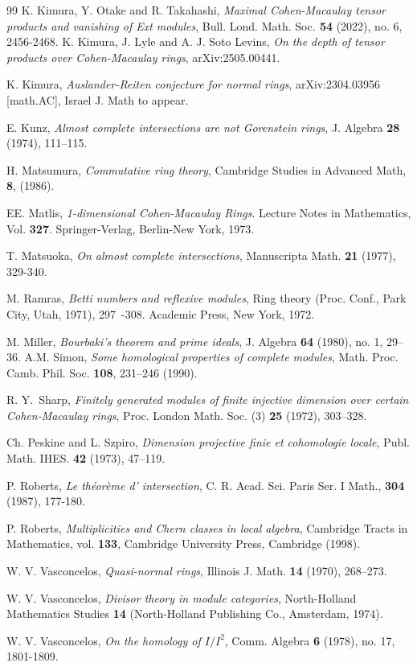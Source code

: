 \documentclass[10. pt,a4paper]{amsart}
\theoremstyle{definition}
\theoremstyle{remark}
\begin{document}
\begin{thebibliography}{99}
  K. Kimura, Y. Otake and R. Takahashi, \emph{Maximal Cohen-Macaulay tensor products and vanishing of Ext modules},
Bull. Lond. Math. Soc.{\bf{ 54}} (2022), no. 6, 2456-2468.
 K. Kimura, J. Lyle and A. J. Soto Levins, {\it
On the depth of tensor products over Cohen-Macaulay rings},  arXiv:2505.00441.

K. Kimura, \emph{
Auslander-Reiten conjecture for normal rings}, arXiv:2304.03956 [math.AC], Israel J. Math
to appear. 

E. Kunz, \emph{Almost complete intersections are not Gorenstein rings}, J. Algebra {\bf{28}} (1974), 111–115.

H. Matsumura, \emph{Commutative ring theory}, Cambridge Studies in Advanced Math, \textbf{8}, (1986).

\bibitem
{E}{E. Matlis}, {\it 1-dimensional Cohen-Macaulay Rings}. Lecture Notes in Mathematics, Vol.  {\bf327}. Springer-Verlag, Berlin-New York, 1973.

T. Matsuoka, \emph{On almost complete intersections}, Manuscripta Math. {\bf{21}} (1977),
329-340.


M. Ramras, \emph{Betti numbers and reflexive modules}, Ring theory (Proc. Conf., Park City, Utah, 1971),   297~-308. Academic Press, New York, 1972.

M.
Miller, \emph{Bourbaki's theorem and prime ideals},
J. Algebra {\bf64} (1980), no. 1, 29–36.
A.M.
Simon, \emph{Some homological properties of complete modules}, Math. Proc. Camb. Phil. Soc.
{\bf108}, 231–246 (1990).


 R. Y.~Sharp, 
\emph{Finitely generated modules of finite injective dimension over certain Cohen-Macaulay rings},
Proc. London Math. Soc. (3) {\bf{25}} (1972), 303–328.





Ch. Peskine and L. Szpiro, \emph{Dimension projective finie et cohomologie locale},
Publ. Math. IHES.  {\bf42} (1973),  47--119.


P. Roberts, \emph{Le th\'{e}or\`{e}me d' intersection}, C. R. Acad. Sci. Paris Ser. I Math.,
{\bf{304}}  (1987),  177-180.

P. Roberts, \emph{Multiplicities and Chern classes in local algebra}, Cambridge
Tracts in Mathematics, vol. {\bf{133}}, Cambridge University Press, Cambridge (1998).

  W. V.
Vasconcelos, \emph{Quasi-normal rings},
Illinois J. Math. \textbf{14} (1970), 268--273.

W. V. Vasconcelos, \emph{Divisor theory in module categories}, North-Holland Mathematics Studies {\bf14} (North-Holland Publishing Co., Amsterdam, 1974).

W. V. Vasconcelos,  \emph{ On the homology of $I/I^2$}, Comm. Algebra {\bf{6}} (1978), no. 17, 1801-1809.

\end{thebibliography}
\end{document}
